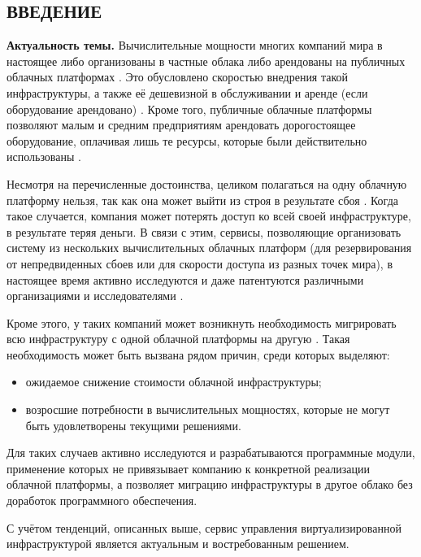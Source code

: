 \begin{center}
\section*{ВВЕДЕНИЕ}
\end{center}
\textbf{Актуальность темы.}
Вычислительные мощности многих компаний мира в настоящее либо организованы в частные облака либо арендованы на публичных облачных платформах \cite{fake-11} \cite{fake-15}. 
Это обусловлено скоростью внедрения такой инфраструктуры, а также её дешевизной в обслуживании и аренде (если оборудование арендовано) \cite{fake-14}.
Кроме того, публичные облачные платформы позволяют малым и средним предприятиям арендовать дорогостоящее оборудование, оплачивая лишь те ресурсы, которые были действительно использованы \cite{fake-13}.

Несмотря на перечисленные достоинства, целиком полагаться на одну облачную платформу нельзя, так как она может выйти из строя в результате сбоя \cite{fake-12}.
Когда такое случается, компания может потерять доступ ко всей своей инфраструктуре, в результате теряя деньги.
В связи с этим, сервисы, позволяющие организовать систему из нескольких вычислительных облачных платформ (для резервирования от непредвиденных сбоев или для скорости доступа из разных точек мира), в настоящее время активно исследуются и даже патентуются различными организациями и исследователями \cite{fake-18}.

Кроме этого, у таких компаний может возникнуть необходимость мигрировать всю инфраструктуру с одной облачной платформы на другую \cite{fake-21}.
Такая необходимость может быть вызвана рядом причин, среди которых выделяют:
\begin{itemize}
    \item ожидаемое снижение стоимости облачной инфраструктуры;
    \item возросшие потребности в вычислительных мощностях, которые не могут быть удовлетворены текущими решениями.
\end{itemize}
Для таких случаев активно исследуются и разрабатываются программные модули, применение которых не привязывает компанию к конкретной реализации облачной платформы, а позволяет миграцию инфраструктуры в другое облако без доработок программного обеспечения.

С учётом тенденций, описанных выше, сервис управления виртуализированной инфраструктурой является актуальным и востребованным решением.

